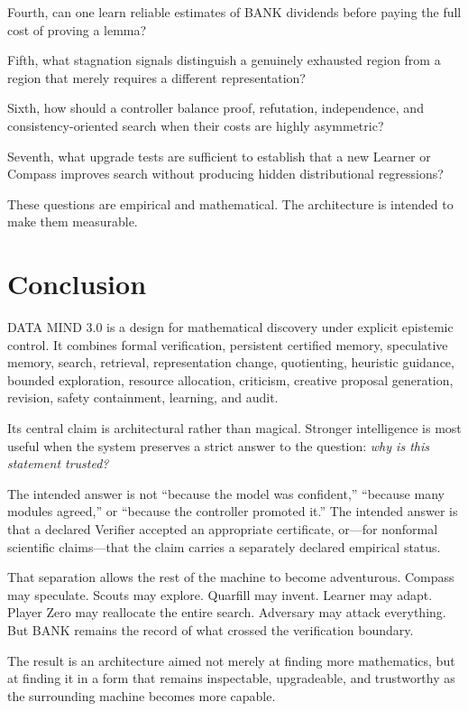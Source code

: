 \documentclass[11pt]{article}
\begin{document}
Fourth, can one learn reliable estimates of BANK dividends before paying the full cost of proving a lemma?

Fifth, what stagnation signals distinguish a genuinely exhausted region from a region that merely requires a different representation?

Sixth, how should a controller balance proof, refutation, independence, and consistency-oriented search when their costs are highly asymmetric?

Seventh, what upgrade tests are sufficient to establish that a new Learner or Compass improves search without producing hidden distributional regressions?

These questions are empirical and mathematical. The architecture is intended to make them measurable.

\section{Conclusion}

DATA MIND 3.0 is a design for mathematical discovery under explicit epistemic control. It combines formal verification, persistent certified memory, speculative memory, search, retrieval, representation change, quotienting, heuristic guidance, bounded exploration, resource allocation, criticism, creative proposal generation, revision, safety containment, learning, and audit.

Its central claim is architectural rather than magical. Stronger intelligence is most useful when the system preserves a strict answer to the question: \emph{why is this statement trusted?}

The intended answer is not ``because the model was confident,'' ``because many modules agreed,'' or ``because the controller promoted it.'' The intended answer is that a declared Verifier accepted an appropriate certificate, or---for nonformal scientific claims---that the claim carries a separately declared empirical status.

That separation allows the rest of the machine to become adventurous. Compass may speculate. Scouts may explore. Quarfill may invent. Learner may adapt. Player Zero may reallocate the entire search. Adversary may attack everything. But BANK remains the record of what crossed the verification boundary.

The result is an architecture aimed not merely at finding more mathematics, but at finding it in a form that remains inspectable, upgradeable, and trustworthy as the surrounding machine becomes more capable.
\end{document}
